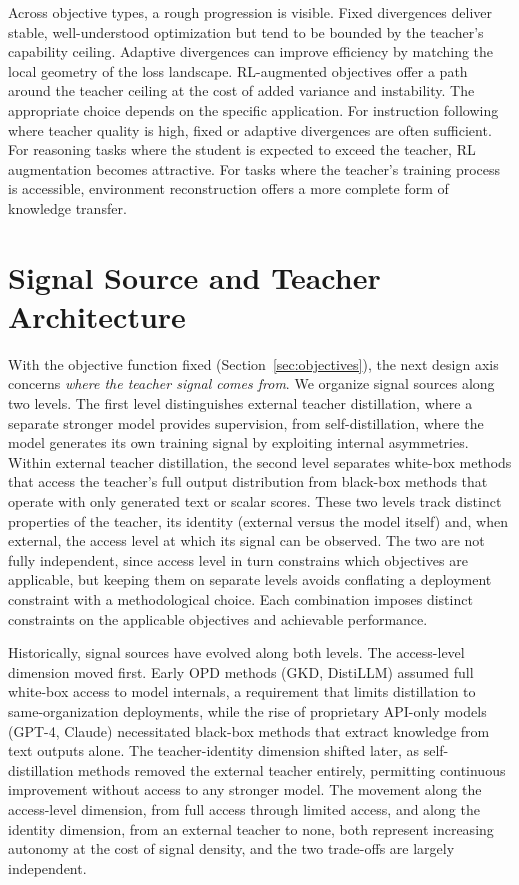 \documentclass{article} %
\begin{document}
Across objective types, a rough progression is visible. Fixed divergences deliver stable, well-understood optimization but tend to be bounded by the teacher's capability ceiling. Adaptive divergences can improve efficiency by matching the local geometry of the loss landscape. RL-augmented objectives offer a path around the teacher ceiling at the cost of added variance and instability. The appropriate choice depends on the specific application. For instruction following where teacher quality is high, fixed or adaptive divergences are often sufficient. For reasoning tasks where the student is expected to exceed the teacher, RL augmentation becomes attractive. For tasks where the teacher's training process is accessible, environment reconstruction offers a more complete form of knowledge transfer.

\section{Signal Source and Teacher Architecture}
\label{sec:signal}

With the objective function fixed (Section~\ref{sec:objectives}), the next design axis concerns \emph{where the teacher signal comes from}. We organize signal sources along two levels. The first level distinguishes external teacher distillation, where a separate stronger model provides supervision, from self-distillation, where the model generates its own training signal by exploiting internal asymmetries. Within external teacher distillation, the second level separates white-box methods that access the teacher's full output distribution from black-box methods that operate with only generated text or scalar scores. These two levels track distinct properties of the teacher, its identity (external versus the model itself) and, when external, the access level at which its signal can be observed. The two are not fully independent, since access level in turn constrains which objectives are applicable, but keeping them on separate levels avoids conflating a deployment constraint with a methodological choice. Each combination imposes distinct constraints on the applicable objectives and achievable performance.

Historically, signal sources have evolved along both levels. The access-level dimension moved first. Early OPD methods (GKD, DistiLLM) assumed full white-box access to model internals, a requirement that limits distillation to same-organization deployments, while the rise of proprietary API-only models (GPT-4, Claude) necessitated black-box methods that extract knowledge from text outputs alone. The teacher-identity dimension shifted later, as self-distillation methods removed the external teacher entirely, permitting continuous improvement without access to any stronger model. The movement along the access-level dimension, from full access through limited access, and along the identity dimension, from an external teacher to none, both represent increasing autonomy at the cost of signal density, and the two trade-offs are largely independent.
\end{document}
